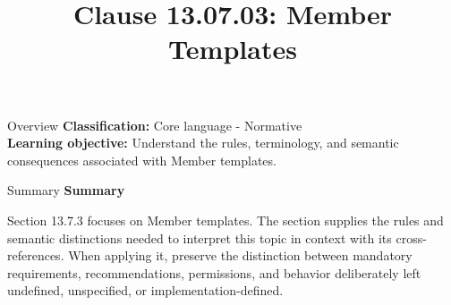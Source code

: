 \documentclass[10pt,letterpaper]{article}
\title{Clause 13.07.03: Member Templates}
\author{}
\date{}
\begin{document}
\maketitle
\begin{CornellOverviewBox}{Overview}
\textbf{Classification:} Core language - Normative\\[2pt]
\textbf{Learning objective:} Understand the rules, terminology, and semantic consequences associated with Member templates.
\end{CornellOverviewBox}\begin{CornellSummaryBox}{Summary}
{\sffamily\bfseries\color{Accent} Summary}\par\vspace{3pt}Section 13.7.3 focuses on Member templates. The section supplies the rules and semantic distinctions needed to interpret this topic in context with its cross-references. When applying it, preserve the distinction between mandatory requirements, recommendations, permissions, and behavior deliberately left undefined, unspecified, or implementation-defined.
\end{CornellSummaryBox}
\end{document}
